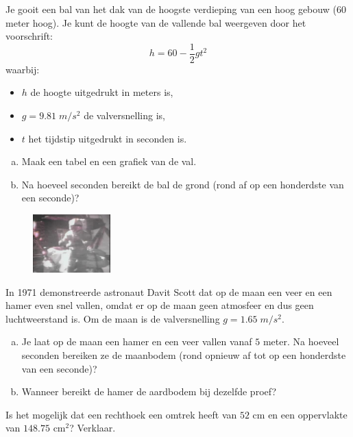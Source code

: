 \documentclass[12pt]{article}
\begin{document}
\begin{oefening}
Je gooit een bal van het dak van de hoogste verdieping van een hoog gebouw ($60$ meter hoog). Je kunt de hoogte van de vallende bal weergeven door het voorschrift:
$$h=60-\frac{1}{2}gt^2$$
waarbij:
\begin{itemize}
  \item $h$ de hoogte uitgedrukt in meters is,
  \item $g=9.81 \;m/s^2$ de valversnelling is,
  \item $t$ het tijdstip uitgedrukt in seconden is.
\end{itemize}
\begin{enumerate}[(a)]
  \item Maak een tabel en een grafiek van de val.
  \item Na hoeveel seconden bereikt de bal de grond (rond af op een honderdste van een seconde)?
\end{enumerate}
\end{oefening}

\begin{oefening}
\begin{figure}
\vspace*{-1.2cm}
\begin{center}
  \includegraphics[width=3cm]{davidscott}
\end{center}
\end{figure}

In 1971 demonstreerde astronaut Davit Scott dat op de maan een veer en een hamer even snel vallen, omdat er op de maan geen atmosfeer en dus geen luchtweerstand is. Om de maan is de valversnelling $g=1.65 \;m/s^2$.

\begin{enumerate}[(a)]
  \item Je laat op de maan een hamer en een veer vallen vanaf $5$ meter. Na hoeveel seconden bereiken ze de maanbodem (rond opnieuw af tot op een honderdste van een seconde)?
  \item Wanneer bereikt de hamer de aardbodem bij dezelfde proef?
\end{enumerate}
\end{oefening}

\begin{oefening}
Is het mogelijk dat een rechthoek een omtrek heeft van $52$ cm en een oppervlakte van $148.75$ cm$^2$? Verklaar.
\end{oefening}
\end{document}

